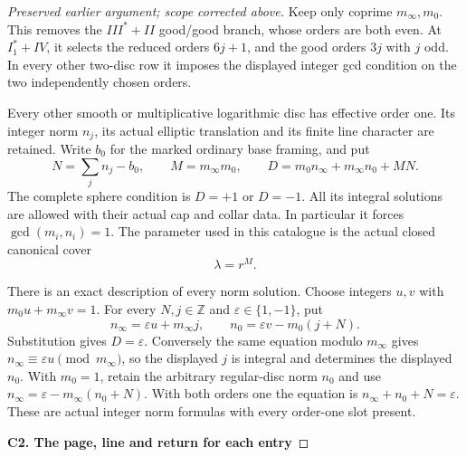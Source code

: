 \begin{proof}[Preserved earlier argument; scope corrected above]
Keep only coprime \(m_\infty,m_0\). This removes the
\(III^*+II\) good/good branch, whose orders are both even.
At \(I_1^*+IV\), it selects the reduced orders \(6j+1\),
and the good orders \(3j\) with \(j\) odd. In every other
two-disc row it imposes the displayed integer gcd condition
on the two independently chosen orders.

Every other smooth or multiplicative logarithmic disc has
effective order one. Its integer norm \(n_j\), its actual
elliptic translation and its finite line character are
retained. Write \(b_0\) for the marked ordinary base framing,
and put
\[
 N=\sum_j n_j-b_0,\qquad
 M=m_\infty m_0,\qquad
 D=m_0n_\infty+m_\infty n_0+MN.                 \tag{SC.1}
\]
The complete sphere condition is \(D=+1\) or \(D=-1\).
All its integral solutions are allowed with their actual
cap and collar data. In particular it forces
\(\gcd(m_i,n_i)=1\). The parameter used in this catalogue is
the actual closed canonical cover
\[
                         \lambda=r^M.          \tag{SC.2}
\]

There is an exact description of every norm solution. Choose
integers \(u,v\) with \(m_0u+m_\infty v=1\). For every
\(N,j\in\mathbb Z\) and \(\varepsilon\in\{1,-1\}\), put
\[
 n_\infty=\varepsilon u+m_\infty j,\qquad
 n_0=\varepsilon v-m_0(j+N).
\]
Substitution gives \(D=\varepsilon\). Conversely the same
equation modulo \(m_\infty\) gives
\(n_\infty\equiv\varepsilon u\pmod {m_\infty}\), so the
displayed \(j\) is integral and determines the displayed
\(n_0\). With \(m_0=1\), retain the arbitrary regular-disc
norm \(n_0\) and use
\(n_\infty=\varepsilon-m_\infty(n_0+N)\).
With both orders one the equation is
\(n_\infty+n_0+N=\varepsilon\).
These are actual integer norm formulas with every
order-one slot present.

\par

\medskip\noindent\textbf{C2. The page, line and return for each entry}

\par\nobreak


\end{proof}
